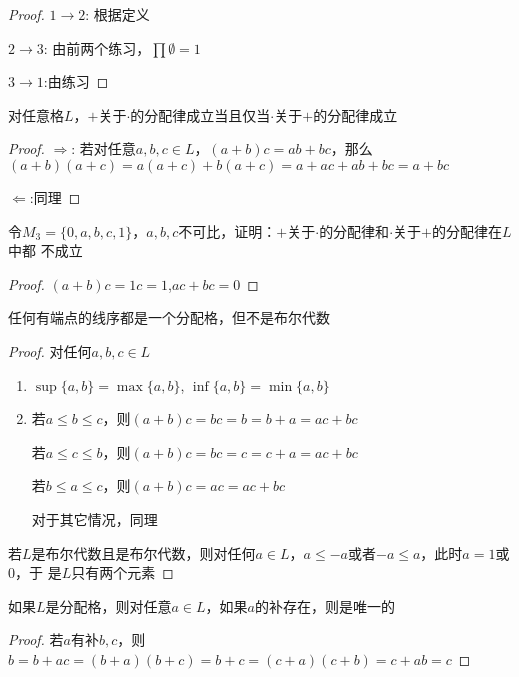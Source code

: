 \documentclass[11pt]{article}
\begin{document}
\begin{proof}
\(1\to 2\): 根据定义

\(2\to 3\): 由前两个练习，\(\prod\emptyset=1\)

\(3\to 1\):由练习
\end{proof}


\begin{exercise}[2.1.13]
对任意格\(L\)，\(+\)关于\(\cdot\)的分配律成立当且仅当\(\cdot\)关于\(+\)的分配律成立
\end{exercise}

\begin{proof}
\(\Rightarrow\): 若对任意\(a,b,c\in L\)，\((a+b)c=ab+bc\)，那么\((a+b)(a+c)=a(a+c)+b(a+c)=a+ac+ab+bc=a+bc\)

\(\Leftarrow\):同理
\end{proof}

\begin{exercise}[2.1.14]
令\(M_3=\{0,a,b,c,1\}\)，\(a,b,c\)不可比，证明：\(+\)关于\(\cdot\)的分配律和\(\cdot\)关于\(+\)的分配律在\(L\)中都
不成立
\end{exercise}

\begin{proof}
\((a+b)c=1c=1\),\(ac+bc=0\)
\end{proof}

\begin{exercise}[2.1.15]
任何有端点的线序都是一个分配格，但不是布尔代数
\end{exercise}

\begin{proof}
对任何\(a,b,c\in L\)
\begin{enumerate}
\item \(\sup\{a,b\}=\max\{a,b\}\), \(\inf\{a,b\}=\min\{a,b\}\)
\item 若\(a\le b\le c\)，则\((a+b)c=bc=b=b+a=ac+bc\)

若\(a\le c\le b\)，则\((a+b)c=bc=c=c+a=ac+bc\)

若\(b\le a\le c\)，则\((a+b)c=ac=ac+bc\)

对于其它情况，同理
\end{enumerate}


若\(L\)是布尔代数且是布尔代数，则对任何\(a\in L\)，\(a\le -a\)或者\(-a\le a\)，此时\(a=1\)或\(0\)，于
是\(L\)只有两个元素
\end{proof}

\begin{exercise}[2.1.17]
如果\(L\)是分配格，则对任意\(a\in L\)，如果\(a\)的补存在，则是唯一的
\end{exercise}

\begin{proof}
若\(a\)有补\(b,c\)，则\(b=b+ac=(b+a)(b+c)=b+c=(c+a)(c+b)=c+ab=c\)
\end{proof}
\end{document}
